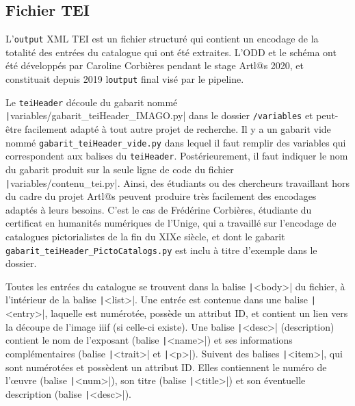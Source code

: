 \documentclass[a4paper,12pt,twoside]{book}
\begin{document}
\subsection{Fichier TEI}

L'\texttt{output} XML TEI est un fichier structuré qui contient un encodage de la totalité des entrées du catalogue qui ont été extraites. L'ODD et le schéma ont été développés par Caroline Corbières pendant le stage Artl@s 2020, et constituait depuis 2019 l\texttt{output} final visé par le pipeline. 

Le \texttt{teiHeader} découle du gabarit nommé \texttt|variables/gabarit_teiHeader_IMAGO.py| dans le dossier \texttt{/variables} et peut-être facilement adapté à tout autre projet de recherche. Il y a un gabarit vide nommé \texttt{gabarit\_teiHeader\_vide.py} dans lequel il faut remplir des variables qui correspondent aux balises du \texttt{teiHeader}. Postérieurement, il faut indiquer le nom du gabarit produit sur la seule ligne de code du fichier \texttt|variables/contenu_tei.py|.
Ainsi, des étudiants ou des chercheurs travaillant hors du cadre du projet Artl@s peuvent produire très facilement des encodages adaptés à leurs besoins. C'est le cas de Frédérine Corbières, étudiante du certificat en humanités numériques de l'Unige, qui a travaillé sur l'encodage de catalogues pictorialistes de la fin du XIXe siècle, et dont le gabarit \texttt{gabarit\_teiHeader\_PictoCatalogs.py} est inclu à titre d'exemple dans le dossier.

Toutes les entrées du catalogue se trouvent dans la balise \texttt|<body>| du fichier, à l'intérieur de la balise \texttt|<list>|.
Une entrée est contenue dans une balise \texttt|<entry>|, laquelle est numérotée, possède un attribut ID, et contient un lien vers la découpe de l'image iiif (si celle-ci existe). Une balise \texttt|<desc>| (description) contient le nom de l'exposant (balise \texttt|<name>|) et ses informations complémentaires (balise \texttt|<trait>| et \texttt|<p>|). Suivent des balises \texttt|<item>|, qui sont numérotées et possèdent un attribut ID. Elles contiennent le numéro de l'œuvre (balise \texttt|<num>|), son titre (balise \texttt|<title>|) et son éventuelle description (balise \texttt|<desc>|).\\
\end{document}
